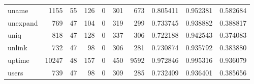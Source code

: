 \begin{tabular}{lrrrrrrrrr}
uname     &                                               1155 &                                                 55 &                                                126 &                                                  0 &                                                301 &                                                673 &                                           0.805411 &                               0.952381 &                             0.582684 \\
unexpand  &                                                769 &                                                 47 &                                                104 &                                                  0 &                                                319 &                                                299 &                                           0.733745 &                               0.938882 &                             0.388817 \\
uniq      &                                                818 &                                                 47 &                                                128 &                                                  0 &                                                337 &                                                306 &                                           0.722188 &                               0.942543 &                             0.374083 \\
unlink    &                                                732 &                                                 47 &                                                 98 &                                                  0 &                                                306 &                                                281 &                                           0.730874 &                               0.935792 &                             0.383880 \\
uptime    &                                              10247 &                                                 48 &                                                157 &                                                  0 &                                                450 &                                               9592 &                                           0.972846 &                               0.995316 &                             0.936079 \\
users     &                                                739 &                                                 47 &                                                 98 &                                                  0 &                                                309 &                                                285 &                                           0.732409 &                               0.936401 &                             0.385656 \\

\end{tabular}
